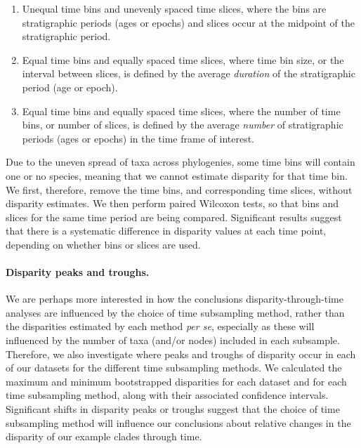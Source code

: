 \documentclass[12pt,a4paper]{article}
\begin{document}
\begin{enumerate}
\begin{enumerate}
\begin{enumerate}
  \item Unequal time bins and unevenly spaced time slices, where the bins are stratigraphic periods (ages or epochs) and slices occur at the midpoint of the stratigraphic period.
  \item Equal time bins and equally spaced time slices, where time bin size, or the interval between slices, is defined by the average \textit{duration} of the stratigraphic period (age or epoch).
  \item Equal time bins and equally spaced time slices, where the number of time bins, or number of slices, is defined by the average \textit{number} of stratigraphic periods (ages or epochs) in the time frame of interest.
\end{enumerate}

Due to the uneven spread of taxa across phylogenies, some time bins will contain one or no species, meaning that we cannot estimate disparity for that time bin. 
We first, therefore, remove the time bins, and corresponding time slices, without disparity estimates. 
We then perform paired Wilcoxon tests, so that bins and slices for the same time period are being compared. 
Significant results suggest that there is a systematic difference in disparity values at each time point, depending on whether bins or slices are used.

\paragraph{Disparity peaks and troughs.}
We are perhaps more interested in how the conclusions disparity-through-time analyses are influenced by the choice of time subsampling method, rather than the disparities estimated by each method \textit{per se}, especially as these will influenced by the number of taxa (and/or nodes) included in each subsample. 
Therefore, we also investigate where peaks and troughs of disparity occur in each of our datasets for the different time subsampling methods. 
We calculated the maximum and minimum bootstrapped disparities for each dataset and for each time subsampling method, along with their associated confidence intervals.
Significant shifts in disparity peaks or troughs suggest that the choice of time subsampling method will influence our conclusions about relative changes in the disparity of our example clades through time. 


\end{enumerate}
\end{enumerate}
\end{document}
